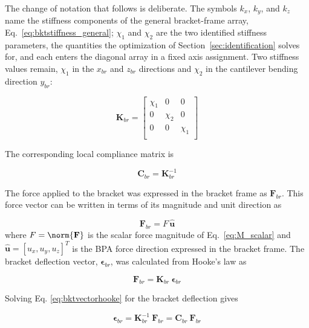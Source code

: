 The change of notation that follows is deliberate. The symbols $k_{x}$, $k_{y}$, and $k_{z}$ name the stiffness components of the general bracket-frame array, Eq.~\eqref{eq:bktstiffness_general}; $\chi_{1}$ and $\chi_{2}$ are the two identified stiffness parameters, the quantities the optimization of Section~\ref{sec:identification} solves for, and each enters the diagonal array in a fixed axis assignment. Two stiffness values remain, $\chi_{1}$ in the $x_{br}$ and $z_{br}$ directions and $\chi_{2}$ in the cantilever bending direction $y_{br}$:

\begin{equation}
\mathbf{K}_{br} = 
\begin{bmatrix}
\chi_{1} & 0   & 0 \\
0   & \chi_{2} & 0 \\
0   & 0   & \chi_{1} \\
\end{bmatrix}
\label{eq:bktstiffness}
\end{equation}

The corresponding local compliance matrix is 

\begin{equation}
\mathbf{C}_{br} = \mathbf{K}_{br}^{-1}
\label{eq:bktcompliance}
\end{equation}

The force applied to the bracket was expressed in the bracket frame as $\mathbf{F}_{br}$. This force vector can be written in terms of its magnitude and unit direction as

\begin{equation}
\mathbf{F}_{br} = F \, \hat{\mathbf{u}}
\label{eq:bktforcevector}
\end{equation}
\noindent
where $F = \norm{\mathbf{F}}$ is the scalar force magnitude of Eq.~\eqref{eq:M_scalar} and $\hat{\mathbf{u}} = [u_{x}, u_{y}, u_{z}]^{T}$ is the BPA force direction expressed in the bracket frame. The bracket deflection vector, $\boldsymbol{\epsilon}_{br}$, was calculated from Hooke's law as 

\begin{equation} \mathbf{F}_{br} = \mathbf{K}_{br} \: \boldsymbol{\epsilon}_{br}
\label{eq:bktvectorhooke}
\end{equation}

Solving Eq. \ref{eq:bktvectorhooke} for the bracket deflection gives

\begin{equation}
\boldsymbol{\epsilon}_{br} = \mathbf{K}_{br}^{-1} \: \mathbf{F}_{br} = \mathbf{C}_{br} \: \mathbf{F}_{br}
\label{eq:bktdeflection}
\end{equation}

